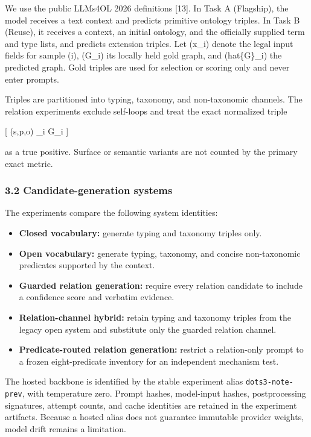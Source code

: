 \documentclass[
]{article}
\providecommand{\tightlist}{%
  \setlength{\itemsep}{0pt}\setlength{\parskip}{0pt}}
\begin{document}
We use the public LLMs4OL 2026 definitions {[}13{]}. In Task A
(Flagship), the model receives a text context and predicts primitive
ontology triples. In Task B (Reuse), it receives a context, an initial
ontology, and the officially supplied term and type lists, and predicts
extension triples. Let (x\_i) denote the legal input fields for sample
(i), (G\_i) its locally held gold graph, and (hat\{G\}\_i) the predicted
graph. Gold triples are used for selection or scoring only and never
enter prompts.

Triples are partitioned into typing, taxonomy, and non-taxonomic
channels. The relation experiments exclude self-loops and treat the
exact normalized triple

{[} (s,p,o) \in {}\_i \cap G\_i {]}

as a true positive. Surface or semantic variants are not counted by the
primary exact metric.

\subsubsection{3.2 Candidate-generation
systems}\label{candidate-generation-systems}

The experiments compare the following system identities:

\begin{itemize}
\tightlist
\item
  \textbf{Closed vocabulary:} generate typing and taxonomy triples only.
\item
  \textbf{Open vocabulary:} generate typing, taxonomy, and concise
  non-taxonomic predicates supported by the context.
\item
  \textbf{Guarded relation generation:} require every relation candidate
  to include a confidence score and verbatim evidence.
\item
  \textbf{Relation-channel hybrid:} retain typing and taxonomy triples
  from the legacy open system and substitute only the guarded relation
  channel.
\item
  \textbf{Predicate-routed relation generation:} restrict a
  relation-only prompt to a frozen eight-predicate inventory for an
  independent mechanism test.
\end{itemize}

The hosted backbone is identified by the stable experiment alias
\texttt{dots3-note-prev}, with temperature zero. Prompt hashes,
model-input hashes, postprocessing signatures, attempt counts, and cache
identities are retained in the experiment artifacts. Because a hosted
alias does not guarantee immutable provider weights, model drift remains
a limitation.
\end{document}
